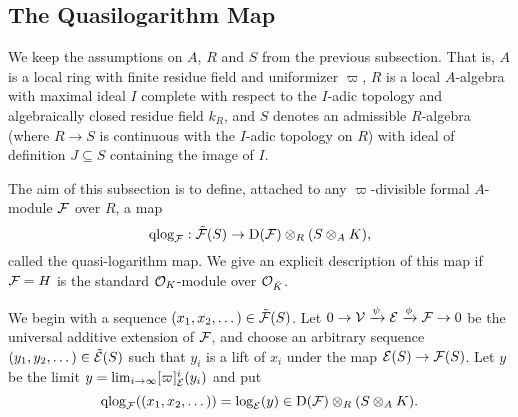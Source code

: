 \documentclass[../main.tex]{subfiles}
\begin{document}

\subsection{The Quasilogarithm Map} %
\label{sub:The Quasilogarithm map}
We keep the assumptions on $A$, $R$ and $S$ from the previous subsection. That is,
$A$ is a local ring with finite residue field and uniformizer $\varpi$, 
$R$ is a local $A$-algebra with maximal ideal $I$ complete with respect to
the $I$-adic topology and algebraically closed residue field $k_R$, and 
$S$ denotes an admissible $R$-algebra (where $R \to S$ is continuous with
the $I$-adic topology on $R$) with ideal of definition $J \subseteq S$ containing
the image of $I$. 

The aim of this subsection is to define, attached to any $\varpi$-divisible formal
$A$-module $\mathcal{F}$ over $R$, a map
\begin{equation*}
\mathrm{qlog}_{\mathcal{F}}: \tilde {\mathcal{F}}(S) \to \mathrm{D}(\mathcal{F}) \otimes_R (S \otimes_A K),
\end{equation*}
called the quasi-logarithm map.
We give an explicit description of this map if $\mathcal{F} = H$ is the standard
$\mathcal{O}_K$-module over $\mathcal{O}_{\breve K}$. 

We begin with a sequence $(x_1, x_2, \dots) \in \tilde {\mathcal{F}}(S)$. 
Let $0 \to \mathcal{V} \xrightarrow{\psi} \mathcal{E} \xrightarrow{\phi} \mathcal{F} \to 0$ be the universal additive
extension of $\mathcal{F}$, and choose an arbitrary sequence $(y_1, y_2, \dots) \in
\tilde {\mathcal{E}}(S)$ such that $y_i$ is a lift of $x_i$ under the map $\mathcal{E}(S) \to \mathcal{F}(S)$. 
Let $y$ be the limit $y = \lim_{i \to \infty} [\varpi]_{\mathcal{E}}^i(y_i)$ and put 
$$\mathrm{qlog}_{\mathcal{F}}((x_1, x_2, \dots)) = \log_{\mathcal{E}}(y) \in \mathrm{D}(\mathcal{F}) \otimes_R(S \otimes_A K).$$ 
\end{document}

